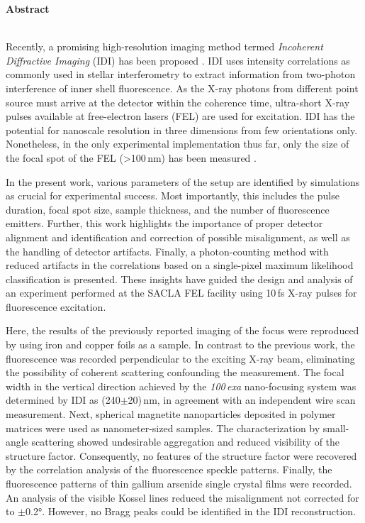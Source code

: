 	\begin{Huge}
		\textbf{Abstract}\vspace{12mm}
	\end{Huge}
\\
Recently, a promising high-resolution imaging method termed \textit{Incoherent Diffractive Imaging} (IDI) has been proposed \cite{classen2017}. IDI uses intensity correlations as commonly used in stellar interferometry to extract information from two-photon interference of inner shell fluorescence. As the X-ray photons from different point source must arrive at the detector within the coherence time, ultra-short X-ray pulses available at free-electron lasers (FEL) are used for excitation.   IDI has the potential for nanoscale resolution in three dimensions from few orientations only. Nonetheless, in the only experimental implementation thus far, only the size of the focal spot of the FEL (>100\,nm) has been measured \cite{nakumura2020}.

In the present work, various parameters of the setup are identified by simulations as crucial for experimental success. Most importantly, this includes the pulse duration, focal spot size,  sample thickness, and the number of fluorescence emitters. Further, this work highlights the importance of proper detector alignment and identification and correction of possible misalignment, as well as the handling of detector artifacts. Finally, a photon-counting method with reduced artifacts in the correlations based on a single-pixel maximum likelihood classification is presented. These insights have guided the design and analysis of an experiment performed at the SACLA FEL facility using 10\,fs X-ray pulses for fluorescence excitation.

Here, the results of the previously reported imaging of the focus were reproduced by using iron and copper foils as a sample.  In contrast to the previous work, the fluorescence was recorded perpendicular to the exciting X-ray beam, eliminating the possibility of coherent scattering confounding the measurement. The focal width in the vertical direction achieved by the \textit{100\,exa} nano-focusing system was determined by IDI  as (240$\pm$20)\,nm, in agreement with an independent wire scan measurement. Next, spherical magnetite nanoparticles deposited in polymer matrices were used as nanometer-sized samples. The characterization by small-angle scattering showed undesirable aggregation and reduced visibility of the structure factor. Consequently, no features of the structure factor were recovered by the correlation analysis of the fluorescence speckle patterns.  Finally, the fluorescence patterns of thin gallium arsenide single crystal films were recorded.  An analysis of the visible Kossel lines reduced the misalignment not corrected for to $\pm$0.2°. However, no Bragg peaks could be identified in the IDI reconstruction.

